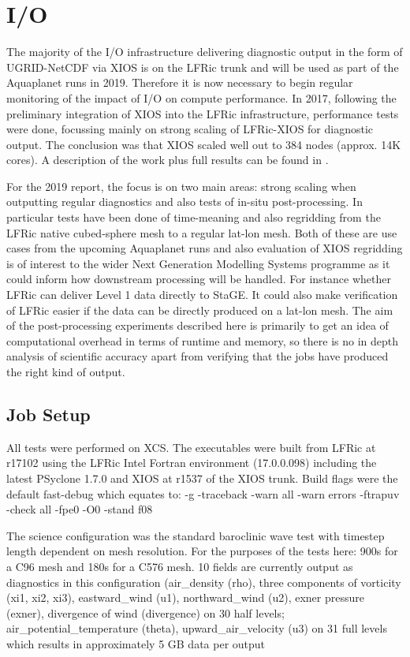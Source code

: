 \section{I/O}
The majority of the I/O infrastructure delivering diagnostic output in the form of UGRID-NetCDF via XIOS is on the LFRic trunk
and will be used as part of the Aquaplanet runs in 2019. Therefore it is now necessary to begin regular monitoring of the impact
of I/O on compute performance. In 2017, following the preliminary integration of XIOS into the LFRic infrastructure, performance
tests were done, focussing mainly on strong scaling of LFRic-XIOS for diagnostic output. The conclusion was that XIOS scaled well
out to 384 nodes (approx. 14K cores). A description of the work plus full results can be found in \cite{Adams2018}. 

For the 2019 report, the focus is on two main areas: strong scaling when outputting regular
diagnostics and also tests of in-situ post-processing. In particular tests have been done of time-meaning and also regridding 
from the LFRic native cubed-sphere mesh to a regular lat-lon mesh. Both of these are use cases from the upcoming Aquaplanet
runs and also evaluation of XIOS regridding is of interest to the wider Next Generation Modelling Systems programme as it
could inform how downstream processing will be handled. For instance whether LFRic can deliver Level 1 data directly to StaGE.
It could also make verification of LFRic easier if the data can be directly produced on a lat-lon mesh. The aim of the post-processing
experiments described here is primarily to get an idea of computational overhead in terms of runtime and memory, 
so there is no in depth analysis of scientific accuracy apart from verifying that the jobs have produced the right kind of output. 

\subsection{Job Setup}
All tests were performed on XCS. The executables were built from LFRic at r17102 using the LFRic Intel Fortran environment (17.0.0.098) 
including the latest PSyclone 1.7.0 and XIOS at r1537 of the XIOS trunk. Build flags were the default fast-debug which equates to:
-g -traceback -warn all -warn errors -ftrapuv -check all -fpe0 -O0 -stand f08

The science configuration was the standard baroclinic wave test with timestep length dependent on mesh resolution. 
For the purposes of the tests here: 900s for a C96 mesh and 180s for a C576 mesh.
10 fields are currently output as diagnostics in this configuration (air\_density (rho), three components of vorticity (xi1, xi2, xi3), eastward\_wind (u1), 
northward\_wind (u2), exner pressure (exner), divergence
of wind (divergence) on 30 half levels; air\_potential\_temperature (theta), upward\_air\_velocity (u3) on 31 full levels
which results in approximately 5 GB data per output

